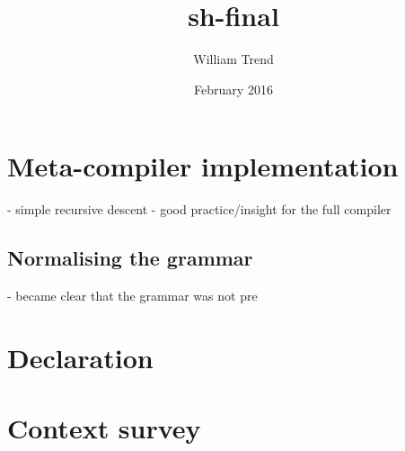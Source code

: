 \documentclass{article}
\title{sh-final}
\author{William Trend}
\date{February 2016}
\begin{document}
\maketitle

\section{Meta-compiler implementation}
- simple recursive descent
- good practice/insight for the full compiler

\subsection{Normalising the grammar}
- became clear that the grammar was not pre

\begin{abstract}

\end{abstract}

\section{Declaration}

\section{Context survey}
\end{document}
